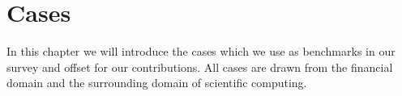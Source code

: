 \chapter{Cases}

In this chapter we will introduce the cases which we use as benchmarks
in our survey and offset for our contributions. All cases are drawn
from the financial domain and the surrounding domain of scientific
computing.






